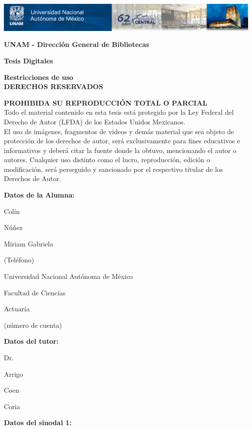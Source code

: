 \includegraphics[width = \textwidth]{DGB.png} %

\textbf{UNAM - Dirección General de Bibliotecas}

\textbf{Tesis Digitales}
 
\textbf{Restricciones de uso}\\

\textbf{DERECHOS RESERVADOS \textcopyright}

\textbf{PROHIBIDA SU REPRODUCCIÓN TOTAL O PARCIAL}\\

Todo el material contenido en esta tesis está protegido por la Ley Federal del Derecho de Autor (LFDA) de los Estados Unidos Mexicanos.\\

El uso de imágenes, fragmentos de videos y demás material que sea objeto de protección de los derechos de autor, será exclusivamente para fines educativos e informativos y deberá citar la fuente donde la obtuvo, mencionando el autor o autores. Cualquier uso distinto como el lucro, reproducción, edición o modificación, será perseguido y sancionado por el respectivo titular de los Derechos de Autor.

\newpage %
\thispagestyle{empty} %

\textbf{Datos de la Alumna:}

Colín

Núñez

Miriam Gabriela

(Teléfono)

Universidad Nacional Autónoma de México

Facultad de Ciencias

Actuaría

(número de cuenta)


\textbf{Datos del tutor:}

Dr.

Arrigo

Coen

Coria


\textbf{Datos del sinodal 1:}




